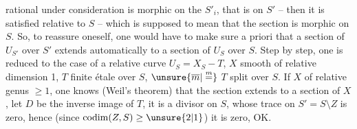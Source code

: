 rational under consideration is morphic on the $S'_i$, that is on $S'$ -- then it is satisfied relative to $S$ -- which is supposed to mean that the section is morphic on $S$. So, to reassure oneself, one would have to make sure a priori that a section of $U_{S'}$ over $S'$ extends automatically to  a section of $U_S$ over $S$. Step by step, one is reduced to the case of a relative curve $U_S=X_S-T$, $X$ smooth  of relative dimension 1, $T$ finite étale over $S$,   $\unsure{\overline m|\overset{m}{=}}$ $T$ split over $S$. If $X$ of relative genus $\geq 1$, one knows (Weil's theorem) that the section extends to a section of $X$, let $D$ be the inverse image of $T$, it is a divisor on $S$, whose trace on $S'=S\setminus Z$ is zero, hence (since $\operatorname{codim}(Z,S)\geq\unsure{2|1}$) it is zero, OK.
